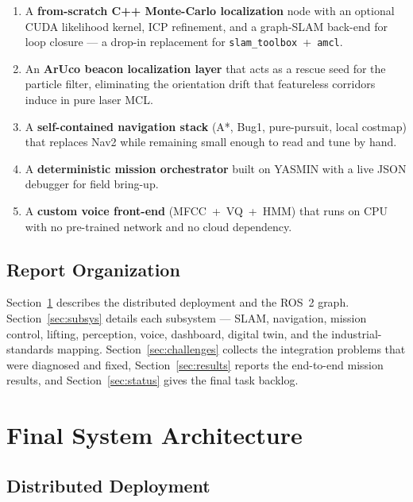 \documentclass[conference]{IEEEtran}
\begin{document}
\begin{enumerate}[noitemsep, leftmargin=*]
  \item A \textbf{from-scratch C++ Monte-Carlo localization} node with an
        optional CUDA likelihood kernel, ICP refinement, and a
        graph-SLAM back-end for loop closure --- a drop-in replacement
        for \texttt{slam\_toolbox}~+~\texttt{amcl}.
  \item An \textbf{ArUco beacon localization layer} that acts as a
        rescue seed for the particle filter, eliminating the orientation
        drift that featureless corridors induce in pure laser MCL.
  \item A \textbf{self-contained navigation stack} (A*, Bug1,
        pure-pursuit, local costmap) that replaces Nav2 while remaining
        small enough to read and tune by hand.
  \item A \textbf{deterministic mission orchestrator} built on YASMIN
        with a live JSON debugger for field bring-up.
  \item A \textbf{custom voice front-end} (MFCC~+~VQ~+~HMM) that runs on
        CPU with no pre-trained network and no cloud dependency.
\end{enumerate}

\subsection{Report Organization}

Section~\ref{sec:arch} describes the distributed deployment and the
ROS~2 graph. Section~\ref{sec:subsys} details each subsystem --- SLAM,
navigation, mission control, lifting, perception, voice, dashboard,
digital twin, and the industrial-standards mapping. Section~\ref{sec:challenges}
collects the integration problems that were diagnosed and fixed,
Section~\ref{sec:results} reports the end-to-end mission results, and
Section~\ref{sec:status} gives the final task backlog.

\section{Final System Architecture}
\label{sec:arch}

\subsection{Distributed Deployment}
\end{document}
